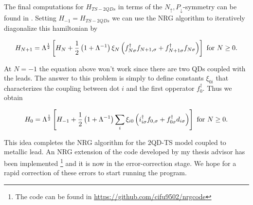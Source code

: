 The final computations for $H_{TS-2QDs}$ in terms of the $N_{\uparrow},P_{\downarrow}$-symmetry
can be found in .
Setting $H_{-1}=H_{TS-2QDs}$ we can use the NRG algorithm 
to iteratively diagonalize this hamiltonian by 

\[
H_{N+1}=\Lambda^{\frac{1}{2}}\left[H_{N}+\frac{1}{2}\left(1+\Lambda^{-1}\right)\xi_{N}\left(f_{N\sigma}^{\dagger}f_{N+1,\sigma}+f_{N+1\sigma}^{\dagger}f_{N\sigma}\right)\right]\ \mbox{for \ensuremath{N\geq0}}.
\]


At $N=-1$ the equation above won't work since there are two QDs coupled
with the leads. The answer to this problem is simply to define constants
$\xi_{0i}$ that characterizes the coupling between dot $i$ and the
first opperator $f_{0}^{\dagger}.$ Thus we obtain 

\[
H_{0}=\Lambda^{\frac{1}{2}}\left[H_{-1}+\frac{1}{2}\left(1+\Lambda^{-1}\right)\sum_{i}\xi_{i0}\left(i_{i\sigma}^{\dagger}f_{0,\sigma}+f_{0\sigma}^{\dagger}d_{i\sigma}\right)\right]\ \mbox{for \ensuremath{N\geq0}}.
\]


This idea completes the NRG algorithm for the $2$QD-TS model coupled
to metallic lead. An NRG extension of the code developed by my thesis
advisor has been implemented \footnote{The code can be found in \url{https://github.com/cifu9502/nrgcode}}
and it is now in the error-correction stage. We hope for a rapid correction
of these errors to start running the program. 
